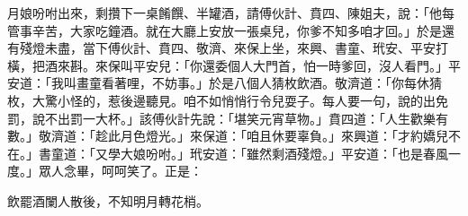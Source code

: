 月娘吩咐出來，剩攢下一桌餚饌、半罐酒，請傅伙計、賁四、陳姐夫，說：「他每管事辛苦，大家吃鐘酒。就在大廳上安放一張桌兒，你爹不知多咱才回。」於是還有殘燈未盡，當下傅伙計、賁四、敬濟、來保上坐，來興、書童、玳安、平安打橫，把酒來斟。來保叫平安兒：「你還委個人大門首，怕一時爹回，沒人看門。」平安道：「我叫畫童看著哩，不妨事。」於是八個人猜枚飲酒。敬濟道：「你每休猜枚，大驚小怪的，惹後邊聽見。咱不如悄悄行令兒耍子。每人要一句，說的出免罰，說不出罰一大杯。」該傅伙計先說：「堪笑元宵草物。」賁四道：「人生歡樂有數。」敬濟道：「趁此月色燈光。」來保道：「咱且休要辜負。」來興道：「才約嬌兒不在。」書童道：「又學大娘吩咐。」玳安道：「雖然剩酒殘燈。」平安道：「也是春風一度。」眾人念畢，呵呵笑了。正是：

飲罷酒闌人散後，不知明月轉花梢。


